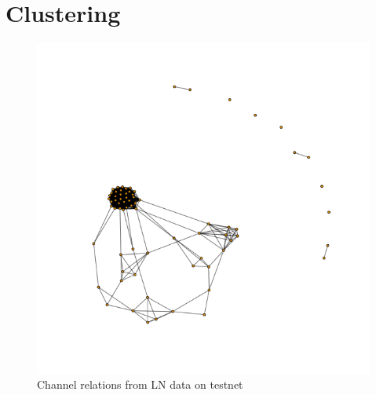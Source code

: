\section{Clustering}

\begin{figure}[h]
    \centering
    \includegraphics[width=12cm]{figures/channelGraphLNTS.png}
    \caption{Channel relations from LN data on testnet}
    \label{fig:channelGraphLNTS}
\end{figure}